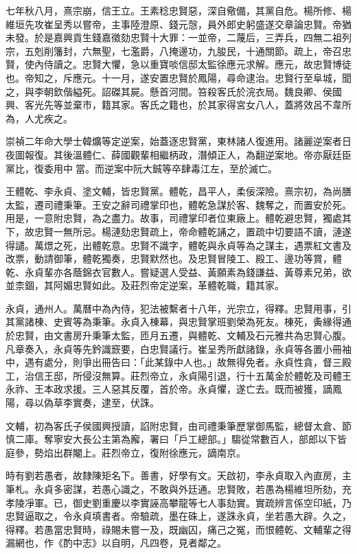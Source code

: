 \begin{pinyinscope}
七年秋八月，熹宗崩，信王立。王素稔忠賢惡，深自儆備，其黨自危。楊所修、楊維垣先攻崔呈秀以嘗帝，主事陸澄原、錢元愨，員外郎史躬盛遂交章論忠賢。帝猶未發。於是嘉興貢生錢嘉徵劾忠賢十大罪：一並帝，二蔑后，三弄兵，四無二祖列宗，五剋削籓封，六無聖，七濫爵，八掩邊功，九朘民，十通關節。疏上，帝召忠賢，使內侍讀之。忠賢大懼，急以重寶啖信邸太監徐應元求解。應元，故忠賢博徒也。帝知之，斥應元。十一月，遂安置忠賢於鳳陽，尋命逮治。忠賢行至阜城，聞之，與李朝欽偕縊死。詔磔其屍。懸首河間。笞殺客氏於浣衣局。魏良卿、侯國興、客光先等並棄市，籍其家。客氏之籍也，於其家得宮女八人，蓋將效呂不韋所為，人尤疾之。

崇禎二年命大學士韓爌等定逆案，始蓋逐忠賢黨，東林諸人復進用。諸麗逆案者日夜圖報復。其後溫體仁、薛國觀輩相繼柄政，潛傾正人，為翻逆案地。帝亦厭廷臣黨比，復委用中當。而逆案中阮大鋮等卒肆毒江左，至於滅亡。

王體乾、李永貞、塗文輔，皆忠賢黨。體乾，昌平人，柔佞深險。熹宗初，為尚膳太監，遷司禮秉筆。王安之辭司禮掌印也，體乾急謀於客、魏奪之，而置安於死。用是，一意附忠賢，為之盡力。故事，司禮掌印者位東廠上。體乾避忠賢，獨處其下，故忠賢一無所忌。楊漣劾忠賢疏上，帝命體乾誦之，置疏中切要語不讀，漣遂得譴。萬燝之死，出體乾意。忠賢不識字，體乾與永貞等為之謀主，遇票紅文書及改票，動請御筆，體乾獨奏，忠賢默然也。及忠賢冒陵工、殿工、邊功等賞，體乾、永貞輩亦各蔭錦衣官數人。嘗疑選人受益、黃願素為錢謙益、黃尊素兄弟，欲並柰錮，其阿媚忠賢如此。及莊烈帝定逆案，革體乾職，籍其家。

永貞，通州人。萬曆中為內侍，犯法被繫者十八年，光宗立，得釋。忠賢用事，引其黨諸棟、史賓等為秉筆。永貞入棟幕，與忠賢掌班劉榮為死友。棟死，夤緣得通於忠賢，由文書房升秉筆太監，匝月五遷，與體乾、文輔及石元雅共為忠賢心腹。凡章奏入，永貞等先鈐識窾要，白忠賢議行。崔呈秀所獻諸錄，永貞等各置小冊袖中，遇有處分，則爭出冊告曰：「此某錄中人也。」故無得免者。永貞性貪，督三殿工，治信王邸，所侵沒無算。莊烈帝立，永貞陽引退，行十五萬金於體乾及司體王永祚、王本政求援。三人惡其反覆，首於帝。永貞懼，遂亡去。既而被獲，謫鳳陽，尋以偽草李實奏，逮至，伏誅。

文輔，初為客氏子侯國興授讀，諂附忠賢，由司禮秉筆歷掌御馬監，總督太倉、節慎二庫。奪寧安大長公主第為廨，署曰「戶工總部。」騶從常數百人，部郎以下皆庭參，勢焰出群閹上。莊烈帝立，復附徐應元，謫南京。

時有劉若愚者，故隸陳矩名下。善書，好學有文。天啟初，李永貞取入內直房，主筆札。永貞多密謀，若愚心識之，不敢與外廷通。忠賢敗，若愚為楊維坦所劾，充孝陵凈軍。已，御史劉重慶以李實誣高攀龍等七人事劾實。實疏辨言係空印紙，乃忠賢逼取之，令永貞填書者。帝驗疏，墨在硃上，遂誅永貞，坐若愚大辟。久之，得釋。若愚當忠賢時，祿賜未嘗一及，既幽囚，痛己之冤，而恨體乾、文輔輩之得漏網也，作《酌中志》以自明，凡四卷，見者鄰之。


\end{pinyinscope}
